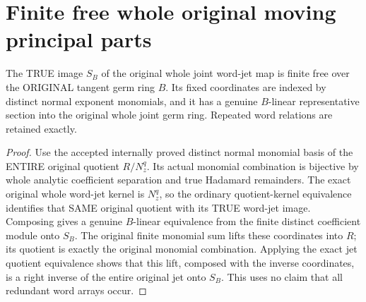 \section{Finite free whole original moving principal parts}

\begin{theorem}
\label{hir:actual-centre-joint-jet-finite-free-splitting}
The TRUE image $S_B$ of the original whole joint word-jet map is finite
free over the ORIGINAL tangent germ ring $B$. Its fixed coordinates are
indexed by distinct normal exponent monomials, and it has a genuine
$B$-linear representative section into the original whole joint germ ring.
Repeated word relations are retained exactly.
\leanok
\end{theorem}
\begin{proof}
Use the accepted internally proved distinct normal monomial basis of the
ENTIRE original quotient $R/N_z^q$. Its actual monomial combination is
bijective by whole analytic coefficient separation and true Hadamard
remainders. The exact original whole word-jet kernel is $N_z^q$, so the
ordinary quotient-kernel equivalence identifies that SAME original
quotient with its TRUE word-jet image. Composing gives a genuine
$B$-linear equivalence from the finite distinct coefficient module onto
$S_B$. The original finite monomial sum lifts these coordinates into
$R$; its quotient is exactly the original monomial combination. Applying
the exact jet quotient equivalence shows that this lift, composed with
the inverse coordinates, is a right inverse of the entire original
jet onto $S_B$. This uses no claim that all redundant word arrays occur.
\end{proof}

